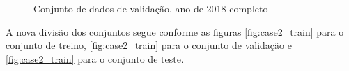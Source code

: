 \documentclass[	12pt, Times, openright, twoside, a4paper, english, brazil]{abntex2}
\begin{document}
{\begin{center}
\begin{minipage}[b]{0.45\textwidth}
\begin{figure}[H]
{                  \caption{Conjunto de dados de validação, ano de 2018 completo} \label{fig:case2_val} }
                \end{figure}
                \end{minipage}
                 \begin{minipage}[b]{0.45\textwidth}
                \begin{figure}[H]
                \end{figure}
                \end{minipage} \end{center} }
    	        
    	        A nova divisão dos conjuntos segue conforme as figuras \ref{fig:case2_train} para o conjunto de treino, \ref{fig:case2_train} para o conjunto de validação e \ref{fig:case2_train} para o conjunto de teste.
    	   
\end{document}
